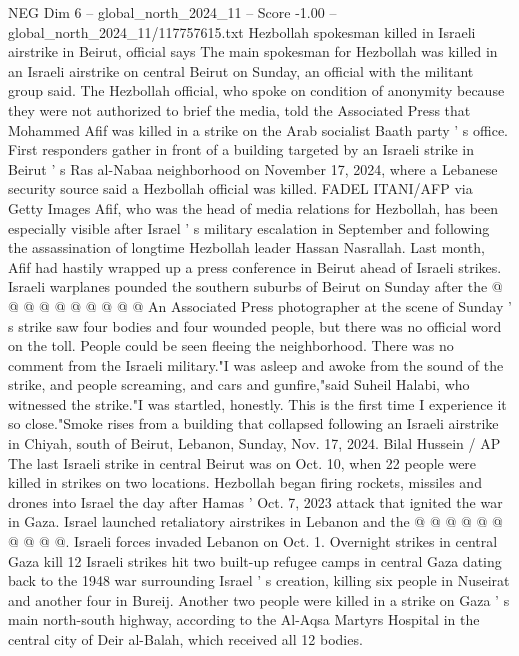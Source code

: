 \begin{textsample}{NEG Dim 6 – global\_north\_2024\_11 – Score -1.00 – global\_north\_2024\_11/117757615.txt}  \label{ex:f6_neg_103}
Hezbollah spokesman killed in Israeli airstrike in Beirut, official says The main spokesman for Hezbollah was killed in an Israeli airstrike on central Beirut on Sunday, an official with the militant group said.
The Hezbollah official, who spoke on condition of anonymity because they were not authorized to brief the media, told the Associated Press that Mohammed Afif was killed in a strike on the Arab socialist Baath party ' s office.
First responders gather in front of a building targeted by an Israeli strike in Beirut ' s Ras al-Nabaa neighborhood on November 17, 2024, where a Lebanese security source said a Hezbollah official was killed.
FADEL ITANI/AFP via Getty Images Afif, who was the head of media relations for Hezbollah, has been especially visible after Israel ' s military escalation in September and following the assassination of longtime Hezbollah leader Hassan Nasrallah.
Last month, Afif had hastily wrapped up a press conference in Beirut ahead of Israeli strikes.
Israeli warplanes pounded the southern suburbs of Beirut on Sunday after the @ @ @ @ @ @ @ @ @ @ An Associated Press photographer at the scene of Sunday ' s strike saw four bodies and four wounded people, but there was no official word on the toll.
People could be seen fleeing the neighborhood.
There was no comment from the Israeli military."I was asleep and awoke from the sound of the strike, and people screaming, and cars and gunfire,"said Suheil Halabi, who witnessed the strike."I was startled, honestly.
This is the first time I experience it so close."Smoke rises from a building that collapsed following an Israeli airstrike in Chiyah, south of Beirut, Lebanon, Sunday, Nov. 17, 2024.
Bilal Hussein / AP The last Israeli strike in central Beirut was on Oct. 10, when 22 people were killed in strikes on two locations.
Hezbollah began firing rockets, missiles and drones into Israel the day after Hamas ' Oct. 7, 2023 attack that ignited the war in Gaza.
Israel launched retaliatory airstrikes in Lebanon and the @ @ @ @ @ @ @ @ @ @.
Israeli forces invaded Lebanon on Oct. 1.
Overnight strikes in central Gaza kill 12 Israeli strikes hit two built-up refugee camps in central Gaza dating back to the 1948 war surrounding Israel ' s creation, killing six people in Nuseirat and another four in Bureij.
Another two people were killed in a strike on Gaza ' s main north-south highway, according to the Al-Aqsa Martyrs Hospital in the central city of Deir al-Balah, which received all 12 bodies.

\end{textsample}
